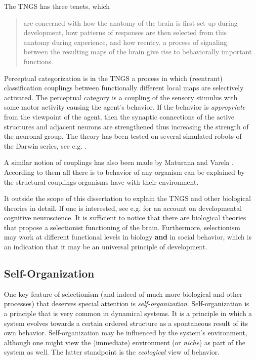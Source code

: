 The TNGS has three tenets, which

\begin{quote}
are concerned with how the anatomy of the brain is first set up during development, how patterns of responses are then selected from this anatomy during experience, and how reentry, a process of signaling between the resulting maps of the brain give rise to behaviorally important functions. \cite[p. 83]{edelman:1992}
\end{quote}

Perceptual categorization is in the TNGS a process in which (reentrant) classification couplings between functionally different local maps are selectively activated. The perceptual category is a coupling of the sensory stimulus with some motor activity causing the agent's behavior. If the behavior is {\em appropriate} from the viewpoint of the agent, then the synaptic connections of the active structures and adjacent neurons are strengthened thus increasing the strength of the neuronal group. The theory has been tested on several simulated robots of the Darwin series, see e.g. \cite{reekeetal:1989}.

A similar notion of couplings has also been made by Maturana and Varela \cite{maturanavarela:1992}. According to them all there is to behavior of any organism can be explained by the structural couplings organisms have with their environment.

It outside the scope of this dissertation to explain the TNGS and other biological theories in detail. If one is interested, see e.g. \cite{johnson:1997} for an account on developmental cognitive neuroscience. It is sufficient to notice that there are biological theories that propose a selectionist functioning of the brain. Furthermore, selectionism may work at different functional levels in biology {\bf and} in social behavior, which is an indication that it may be an universal principle of development.

\subsection{Self-Organization}

One key feature of selectionism (and indeed of much more biological and other processes) that deserves special attention is {\em self-organization}. Self-organization is a principle that is very common in dynamical systems. It is a principle in which a system evolves towards a certain ordered structure as a spontaneous result of its own behavior. Self-organization may be influenced by the system's environment, although one might view the (immediate) environment (or {\em niche}) as part of the system as well. The latter standpoint is the {\em ecological} view of behavior.

